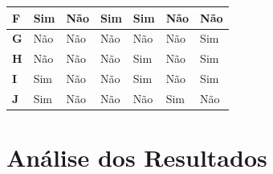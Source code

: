 \documentclass[
	12pt,				%
	openright,			%
	oneside,			%
	a4paper,			%
	english,			%
	french,				%
	spanish,			%
	brazil,				%
	]{abntex2}
\begin{document}
\begin{table}[h!]
\begin{tabular}{L|L|L|L|L|L|L}
\textbf{F}	& Sim                                               & Não                                                                          & Sim                                                 & Sim                                                             & Não                                                       & Não                                                                  \\ \hline
\textbf{G}	& Não                                               & Não                                                                          & Não                                                 & Não                                                             & Não                                                       & Sim                                                                  \\ \hline
\textbf{H}	& Não                                               & Não                                                                          & Não                                                 & Sim                                                             & Não                                                       & Sim                                                                  \\ \hline
\textbf{I}	& Sim                                               & Não                                                                          & Não                                                 & Sim                                                             & Não                                                       & Sim                                                                  \\ \hline
\textbf{J}	& Sim                                               & Não                                                                          & Não                                                 & Não                                                             & Sim                                                       & Não                                                                  \\
\end{tabular}
\end{table}
 

\chapter{Análise dos Resultados}
\end{document}
